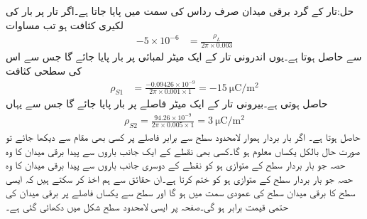 حل:تار کے گرد برقی میدان صرف رداس کی سمت میں پایا جاتا ہے۔اگر تار پر بار کی لکیری کثافت  ہو تب مساوات
\begin{align*}
-5 \times 10^{-6}&=\frac{\rho_L}{2 \pi  \times 0.003}
\end{align*}
سے  حاصل ہوتا ہے۔یوں اندرونی تار کے ایک میٹر لمبائی پر  بار پایا جائے گا جس سے اس کی سطحی کثافت
\begin{align*}
\rho_{S1}&=\frac{-0.09426 \times 10^{-9}}{2\pi \times 0.001 \times 1}=\SI{-15}{\micro \coulomb \per \meter \squared}
\end{align*}
حاصل ہوتی ہے۔بیرونی تار کے ایک میٹر فاصلے پر  بار پایا جائے گا جس سے یہاں
\begin{align*}
\rho_{S2}=\frac{94.26 \times 10^{-9}}{2\pi \times 0.005 \times 1}=\SI{3}{\micro \coulomb \per \meter \squared}
\end{align*}
حاصل ہوتا ہے۔
اگر بار بردار ہموار لامحدود سطح  سے برابر فاصلے پر کسی بھی  مقام سے دیکھا جائے تو صورت حال بالکل یکساں معلوم ہو گا۔کسی بھی نقطے کے ایک جانب باروں سے پیدا برقی میدان کا وہ حصہ جو بار بردار سطح  کے متوازی ہو کو نقطے کے دوسری جانب باروں سے پیدا برقی میدان کا وہ حصہ جو بار بردار سطح  کے متوازی ہو کو ختم کرتا ہے۔ان حقائق سے ہم اخذ کر سکتے ہیں کہ ایسی سطح کا برقی میدان سطح کی عمودی سمت میں ہو گا اور سطح سے یکساں فاصلے پر برقی میدان کی حتمی قیمت برابر ہو گی۔صفحہ  پر ایسی لامحدود سطح شکل  میں دکھائی گئی ہے۔


